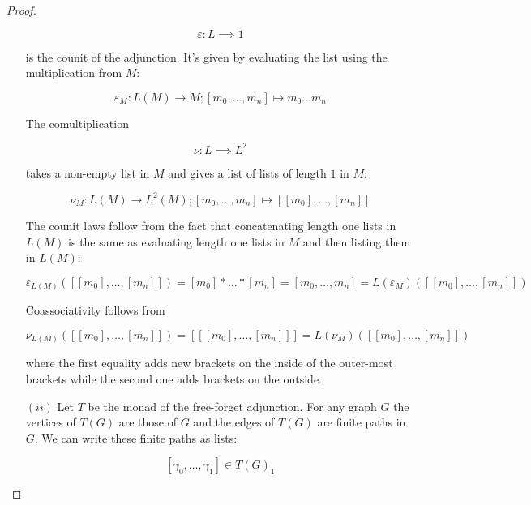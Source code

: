 \documentclass[11pt]{amsart}
\theoremstyle{plain}
\theoremstyle{definition}
\newcommand{\vep}{\varepsilon}
\newcommand{\noi}{{\noindent}}
\begin{document}
\begin{proof}
\begin{enumerate}
        \[ \vep : L \implies 1 \]

        \noi is the counit of the adjunction. It's given by evaluating the list using the multiplication from $M$: 

        \[ \vep_M : L(M) \to M ; [m_0 , \dots , m_n] \mapsto m_0 \dots m_n \]

        \noi The comultiplication 

        \[ \nu : L \implies L^2 \]

        \noi takes a non-empty list in $M$ and gives a list of lists of length $1$ in $M$:

        \[ \nu_M : L(M) \to L^2(M) ; [m_0, \dots, m_n ] \mapsto [[m_0] , \dots , [m_n]]\]

        \noi The counit laws follow from the fact that concatenating length one lists in $L(M)$ is the same as evaluating length one lists in $M$ and then listing them in $L(M)$: 

        \[ \vep_{L(M)} ([[m_0] , \dots , [m_n]]) = [m_0] * \dots * [m_n] = [m_0 , \dots , m_n] = L(\vep_M) ([[m_0] , \dots , [m_n]])\]

        \noi Coassociativity follows from
        

        \[ \nu_{L(M)} ([[m_0] , \dots , [m_n]])
        = [[[m_0] , \dots , [m_n]]]
        = L(\nu_M) ([[m_0] , \dots , [m_n]])\]

        \noi where the first equality adds new brackets on the inside of the outer-most brackets while the second one adds brackets on the outside. \bigskip 


        
        

        
        




        
        
        \item[$(ii)$] Let $T$ be the monad of the free-forget adjunction. For any graph $G$ the vertices of $T(G)$ are those of $G$ and the edges of $T(G)$ are finite paths in $G$. We can write these finite paths as lists: 
        
        \[ [\gamma_0, \dots , \gamma_1] \in T(G)_1 \]
        

\end{enumerate}
\end{proof}
\end{document}
